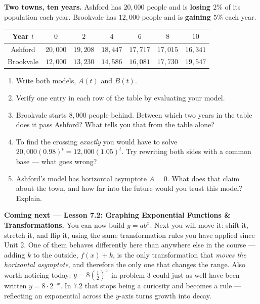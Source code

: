 \documentclass[10pt]{article}
\begin{document}
\begin{extensionbox}
\textbf{Two towns, ten years.} Ashford has $20{,}000$ people and is \textbf{losing $2\%$} of its
population each year. Brookvale has $12{,}000$ people and is \textbf{gaining $5\%$} each year.
\begin{center}
\renewcommand{\arraystretch}{1.25}
\begin{tabular}{|c|c|c|c|c|c|c|}
\hline
Year $t$ & $0$ & $2$ & $4$ & $6$ & $8$ & $10$ \\ \hline
Ashford & $20{,}000$ & $19{,}208$ & $18{,}447$ & $17{,}717$ & $17{,}015$ & $16{,}341$ \\ \hline
Brookvale & $12{,}000$ & $13{,}230$ & $14{,}586$ & $16{,}081$ & $17{,}730$ & $19{,}547$ \\ \hline
\end{tabular}
\end{center}
\begin{enumerate}[label=(\alph*), leftmargin=1.8em, itemsep=5pt]
  \item Write both models, $A(t)$ and $B(t)$.
  \item Verify one entry in each row of the table by evaluating your model.
  \item Brookvale starts $8{,}000$ people behind. Between which two years in the table does it pass
        Ashford? What tells you that from the table alone?
  \item To find the crossing \emph{exactly} you would have to solve
        $20{,}000(0.98)^{t} = 12{,}000(1.05)^{t}$. Try rewriting both sides with a common base ---
        what goes wrong?
  \item Ashford's model has horizontal asymptote $A=0$. What does that claim about the town, and how
        far into the future would you trust this model? Explain.
\end{enumerate}
\end{extensionbox}

\begin{spiralbox}
\textbf{Coming next --- Lesson 7.2: Graphing Exponential Functions \& Transformations.} You can now
build $y=ab^{x}$. Next you will move it: shift it, stretch it, and flip it, using the same
transformation rules you have applied since Unit 2. One of them behaves differently here than
anywhere else in the course --- adding $k$ to the outside, $f(x)+k$, is the only transformation that
\emph{moves the horizontal asymptote}, and therefore the only one that changes the range. Also worth
noticing today: $y=8\left(\frac12\right)^{x}$ in problem 3 could just as well have been written
$y=8\cdot 2^{-x}$. In 7.2 that stops being a curiosity and becomes a rule --- reflecting an
exponential across the $y$-axis turns growth into decay.
\end{spiralbox}
\end{document}
